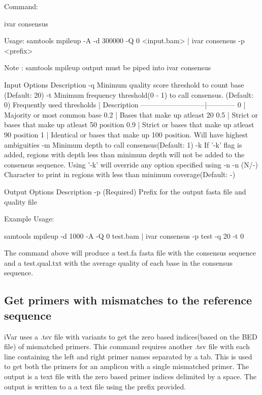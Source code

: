 Command\+: 
\begin{DoxyCode}
ivar consensus

Usage: samtools mpileup -A -d 300000 -Q 0 <input.bam> | ivar consensus -p <prefix>

Note : samtools mpileup output must be piped into ivar consensus

Input Options    Description
           -q    Minimum quality score threshold to count base (Default: 20)
           -t    Minimum frequency threshold(0 - 1) to call consensus. (Default: 0)
                 Frequently used thresholds | Description
                 ---------------------------|------------
                                          0 | Majority or most common base
                                        0.2 | Bases that make up atleast 20%
                                        0.5 | Strict or bases that make up atleast 50%
       position
                                        0.9 | Strict or bases that make up atleast 90%
       position
                                          1 | Identical or bases that make up 100%
       position. Will have highest ambiguities
           -m    Minimum depth to call consensus(Default: 1)
           -k    If '-k' flag is added, regions with depth less than minimum depth will not be added to the
       consensus sequence. Using '-k' will override any option specified using -n
           -n    (N/-) Character to print in regions with less than minimum coverage(Default: -)

Output Options   Description
           -p    (Required) Prefix for the output fasta file and quality file
\end{DoxyCode}


Example Usage\+: 
\begin{DoxyCode}
samtools mpileup -d 1000 -A -Q 0 test.bam | ivar consensus -p test -q 20 -t 0
\end{DoxyCode}


The command above will produce a test.\+fa fasta file with the consensus sequence and a test.\+qual.\+txt with the average quality of each base in the consensus sequence.\hypertarget{manualpage_autotoc_md20}{}\subsection{Get primers with mismatches to the reference sequence}\label{manualpage_autotoc_md20}
i\+Var uses a .tsv file with variants to get the zero based indices(based on the B\+E\+D file) of mismatched primers. This command requires another .tsv file with each line containing the left and right primer names separated by a tab. This is used to get both the primers for an amplicon with a single mismatched primer. The output is a text file with the zero based primer indices delimited by a space. The output is written to a a text file using the prefix provided.

